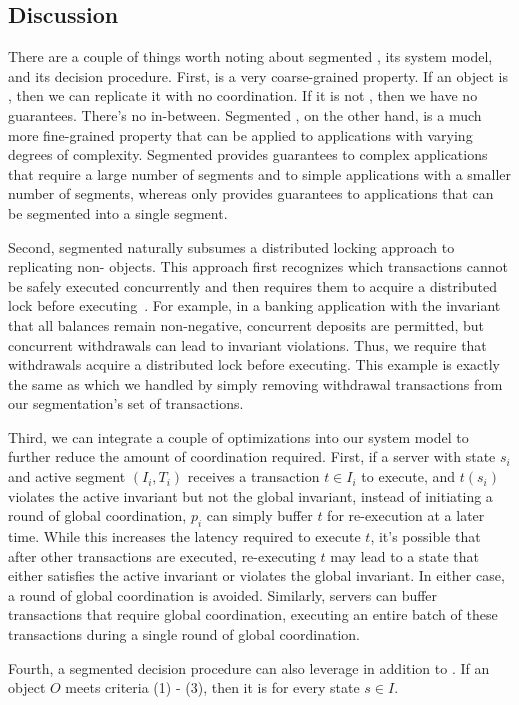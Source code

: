 \subsection{Discussion}
There are a couple of things worth noting about segmented \invariantconfluence{},
its system model, and its decision procedure. First, \invariantconfluence{} is a
very coarse-grained property. If an object is \invariantconfluent{}, then we can
replicate it with no coordination. If it is not \invariantconfluent{}, then we
have no guarantees. There's no in-between. Segmented \invariantconfluence{}, on
the other hand, is a much more fine-grained property that can be applied to
applications with varying degrees of complexity. Segmented
\invariantconfluence{} provides guarantees to complex applications that require a
large number of segments and to simple applications with a smaller number of
segments, whereas \invariantconfluence{} only provides guarantees to applications
that can be segmented into a single segment.

Second, segmented \invariantconfluence{} naturally subsumes a distributed locking
approach to replicating non-\invariantconfluent{} objects.  This approach first
recognizes which transactions cannot be safely executed concurrently and then
requires them to acquire a distributed lock before
executing~\cite{balegas2015putting, gotsman2016cause}. For example, in a
banking application with the invariant that all balances remain non-negative,
concurrent deposits are permitted, but concurrent withdrawals can lead to
invariant violations. Thus, we require that withdrawals acquire a distributed
lock before executing. This example is exactly the same as
 which we handled by simply removing
withdrawal transactions from our segmentation's set of transactions.

Third, we can integrate a couple of optimizations into our system model to
further reduce the amount of coordination required. First, if a server with
state $s_i$ and active segment $(I_i, T_i)$ receives a transaction $t \in I_i$
to execute, and $t(s_i)$ violates the active invariant but not the global
invariant, instead of initiating a round of global coordination, $p_i$ can
simply buffer $t$ for re-execution at a later time. While this increases the
latency required to execute $t$, it's possible that after other transactions
are executed, re-executing $t$ may lead to a state that either satisfies the
active invariant or violates the global invariant. In either case, a round of
global coordination is avoided. Similarly, servers can buffer transactions that
require global coordination, executing an entire batch of these transactions
during a single round of global coordination.

Fourth, a segmented \invariantconfluence{} decision procedure can also leverage
 in addition to
. If an object $O$ meets
criteria (1) - (3), then it is  for every state $s \in
I$.
